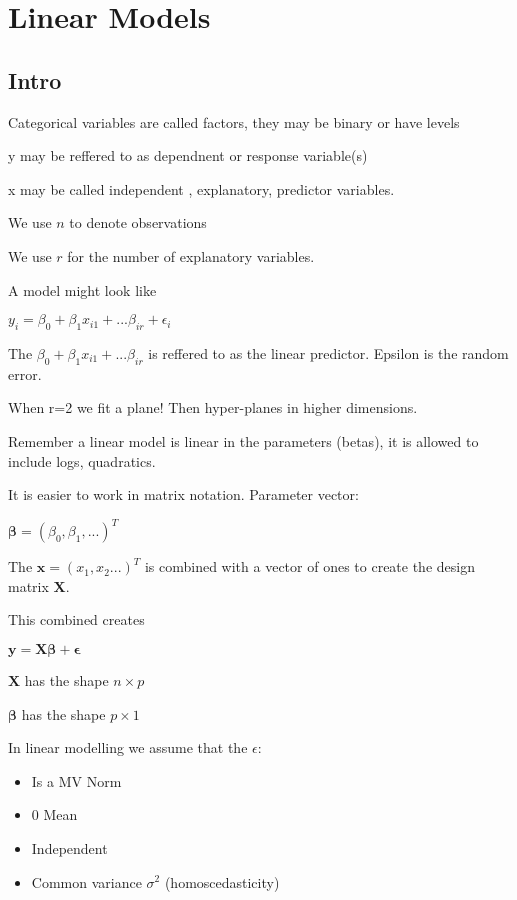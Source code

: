 \documentclass[
  letterpaper,
  DIV=11,
  numbers=noendperiod]{scrreprt}
\providecommand{\tightlist}{%
  \setlength{\itemsep}{0pt}\setlength{\parskip}{0pt}}\usepackage{longtable,booktabs,array}
\begin{document}

\hypertarget{linear-models}{%
\chapter{Linear Models}\label{linear-models}}

\hypertarget{intro}{%
\section{Intro}\label{intro}}

Categorical variables are called factors, they may be binary or have
levels

y may be reffered to as dependnent or response variable(s)

x may be called independent , explanatory, predictor variables.

We use \(n\) to denote observations

We use \(r\) for the number of explanatory variables.

A model might look like

\(y_i = \beta_0 + \beta_1x_{i1} + ... \beta_{ir} + \epsilon_i\)

The \(\beta_0 + \beta_1x_{i1} + ... \beta_{ir}\) is reffered to as the
linear predictor. Epsilon is the random error.

When r=2 we fit a plane! Then hyper-planes in higher dimensions.

Remember a linear model is linear in the parameters (betas), it is
allowed to include logs, quadratics.

It is easier to work in matrix notation. Parameter vector:

\(\boldsymbol{\beta} = (\beta_0, \beta_1, ...)^T\)

The \(\boldsymbol{x} = (x_1, x_2...)^T\) is combined with a vector of
ones to create the design matrix \(\boldsymbol{X}\).

This combined creates

\(\boldsymbol{y} = \boldsymbol{X} \boldsymbol{\beta}+ \boldsymbol{\epsilon}\)

\(\boldsymbol{X}\) has the shape \(n \times p\)

\(\boldsymbol{\beta}\) has the shape \(p \times 1\)

In linear modelling we assume that the \(\epsilon\):

\begin{itemize}
\tightlist
\item
  Is a MV Norm
\item
  0 Mean
\item
  Independent
\item
  Common variance \(\sigma^2\) (homoscedasticity)
\end{itemize}
\end{document}
